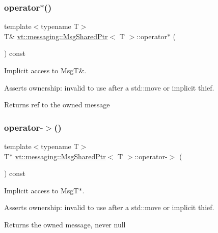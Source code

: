 \subsubsection{\texorpdfstring{operator$\ast$()}{operator*()}}
{\footnotesize\ttfamily template$<$typename T$>$ \\
T\& \hyperlink{structvt_1_1messaging_1_1_msg_shared_ptr}{vt\+::messaging\+::\+Msg\+Shared\+Ptr}$<$ T $>$\+::operator$\ast$ (\begin{DoxyParamCaption}{ }\end{DoxyParamCaption}) const\hspace{0.3cm}{\ttfamily [inline]}}



Implicit access to MsgT\&. 

Asserts ownership\+: invalid to use after a std\+::move or implicit thief.

\begin{DoxyReturn}{Returns}
ref to the owned message 
\end{DoxyReturn}
\mbox{\label{structvt_1_1messaging_1_1_msg_shared_ptr_a4140dc4ea157de37d258c8f8821179c8}} 
\subsubsection{\texorpdfstring{operator-\/$>$()}{operator->()}}
{\footnotesize\ttfamily template$<$typename T$>$ \\
T$\ast$ \hyperlink{structvt_1_1messaging_1_1_msg_shared_ptr}{vt\+::messaging\+::\+Msg\+Shared\+Ptr}$<$ T $>$\+::operator-\/$>$ (\begin{DoxyParamCaption}{ }\end{DoxyParamCaption}) const\hspace{0.3cm}{\ttfamily [inline]}}



Implicit access to Msg\+T$\ast$. 

Asserts ownership\+: invalid to use after a std\+::move or implicit thief.

\begin{DoxyReturn}{Returns}
the owned message, never null 
\end{DoxyReturn}
\mbox{\label{structvt_1_1messaging_1_1_msg_shared_ptr_ac6f496608ceb2f96b9457b0082f76e28}} 
